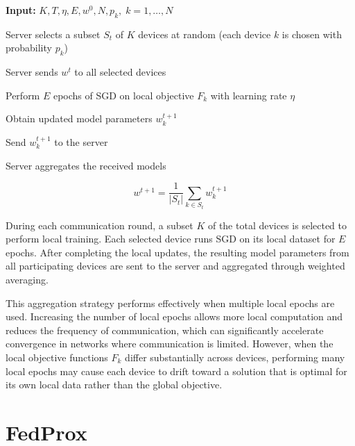\documentclass[12pt]{book}
\begin{document}
\begin{algorithm}[t]
\caption{Federated Averaging (FedAvg)}
\label{alg:fedavg}
\begin{algorithmic}[1]

\STATE \textbf{Input:} $K, T, \eta, E, w^0, N, p_k,\; k = 1,\dots,N$


\STATE Server selects a subset $S_t$ of $K$ devices at random (each device $k$ is chosen with probability $p_k$)

\STATE Server sends $w^t$ to all selected devices


\STATE Perform $E$ epochs of SGD on local objective $F_k$ with learning rate $\eta$

\STATE Obtain updated model parameters $w_k^{t+1}$

\STATE Send $w_k^{t+1}$ to the server

\ENDFOR

\STATE Server aggregates the received models

\[
w^{t+1} = \frac{1}{|S_t|}\sum_{k \in S_t} w_k^{t+1}
\]

\ENDFOR

\end{algorithmic}
\end{algorithm}


During each communication round, a subset $K$ of the total devices is selected to perform local training. Each selected device runs SGD on its local dataset for $E$ epochs. After completing the local updates, the resulting model parameters from all participating devices are sent to the server and aggregated through weighted averaging.

This aggregation strategy performs effectively when multiple local epochs are used. Increasing the number of local epochs allows more local computation and reduces the frequency of communication, which can significantly accelerate convergence in networks where communication is limited. However, when the local objective functions $F_k$ differ substantially across devices, performing many local epochs may cause each device to drift toward a solution that is optimal for its own local data rather than the global objective.

\section{FedProx}
\end{document}
